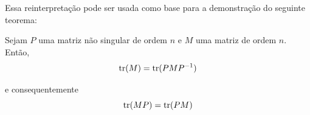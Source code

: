 	\par\vspace{0.3cm} Essa reinterpretação pode ser usada como base para a demonstração do seguinte teorema:
	\begin{theorem}
		\label{traco}
		Sejam $P$ uma matriz não singular de ordem $n$ e $M$ uma matriz de ordem $n$. Então, 
		\begin{equation*}
		\operatorname{tr}(M) = \operatorname{tr}(PMP^{-1})
		\end{equation*}
		\par\vspace{0.3cm} e consequentemente
		\begin{equation*}
		\operatorname{tr}(MP) = \operatorname{tr}(PM)
		\end{equation*}
	\end{theorem} 
